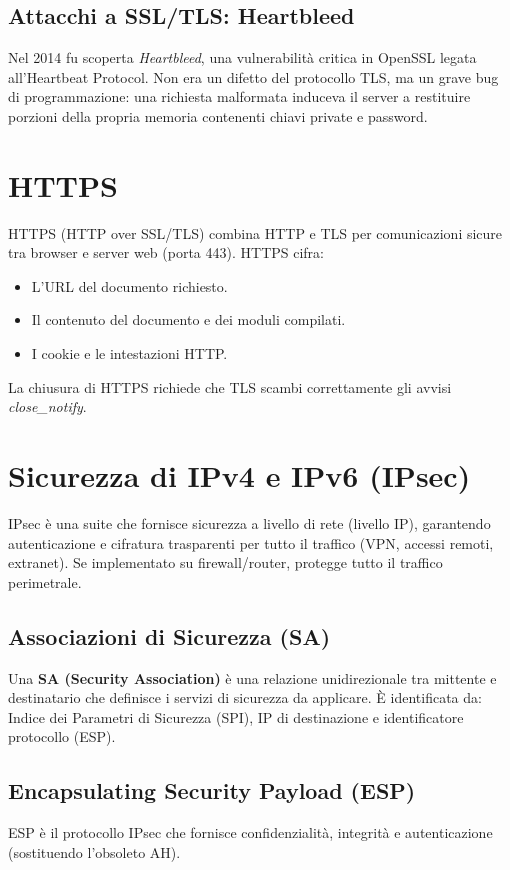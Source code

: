 \subsection{Attacchi a SSL/TLS: Heartbleed}
Nel 2014 fu scoperta \textit{Heartbleed}, una vulnerabilità critica in OpenSSL legata all'Heartbeat Protocol. Non era un difetto del protocollo TLS, ma un grave bug di programmazione: una richiesta malformata induceva il server a restituire porzioni della propria memoria contenenti chiavi private e password.

\section{HTTPS}

HTTPS (HTTP over SSL/TLS) combina HTTP e TLS per comunicazioni sicure tra browser e server web (porta 443). HTTPS cifra:
\begin{itemize}
    \item L'URL del documento richiesto.
    \item Il contenuto del documento e dei moduli compilati.
    \item I cookie e le intestazioni HTTP.
\end{itemize}
La chiusura di HTTPS richiede che TLS scambi correttamente gli avvisi \textit{close\_notify}.

\section{Sicurezza di IPv4 e IPv6 (IPsec)}

IPsec è una suite che fornisce sicurezza a livello di rete (livello IP), garantendo autenticazione e cifratura trasparenti per tutto il traffico (VPN, accessi remoti, extranet). Se implementato su firewall/router, protegge tutto il traffico perimetrale.



\subsection{Associazioni di Sicurezza (SA)}
Una \textbf{SA (Security Association)} è una relazione unidirezionale tra mittente e destinatario che definisce i servizi di sicurezza da applicare. È identificata da: Indice dei Parametri di Sicurezza (SPI), IP di destinazione e identificatore protocollo (ESP).

\subsection{Encapsulating Security Payload (ESP)}
ESP è il protocollo IPsec che fornisce confidenzialità, integrità e autenticazione (sostituendo l'obsoleto AH). 

